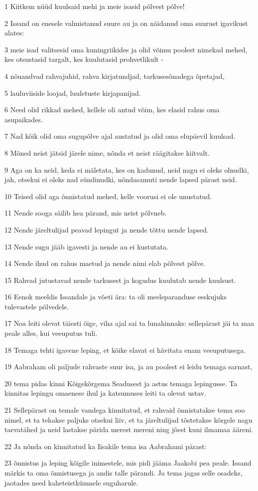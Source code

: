 \par 1 Kiitkem nüüd kuulsaid mehi ja meie isasid põlvest põlve!
\par 2 Issand on enesele valmistanud suure au ja on näidanud oma suurust igavikust alates:
\par 3 meie isad valitsesid oma kuningriikides ja olid võimu poolest nimekad mehed, kes otsustasid targalt, kes kuulutasid prohvetlikult -
\par 4 nõuandvad rahvajuhid, rahva kirjatundjad, tarkusesõnadega õpetajad,
\par 5 lauluviiside loojad, luuletuste kirjapanijad.
\par 6 Need olid rikkad mehed, kellele oli antud võim, kes elasid rahus oma asupaikades.
\par 7 Nad kõik olid oma sugupõlve ajal austatud ja olid oma elupäevil kuulsad.
\par 8 Mõned neist jätsid järele nime, nõnda et neist räägitakse kiitvalt.
\par 9 Aga on ka neid, keda ei mäletata, kes on kadunud, neid nagu ei oleks olnudki, jah, otsekui ei oleks nad sündinudki, nõndasamuti nende lapsed pärast neid.
\par 10 Teised olid aga õnnistatud mehed, kelle voorusi ei ole unustatud.
\par 11 Nende sooga säilib hea pärand, mis neist põlvneb.
\par 12 Nende järeltulijad peavad lepingut ja nende tõttu nende lapsed.
\par 13 Nende sugu jääb igavesti ja nende au ei kustutata.
\par 14 Nende ihud on rahus maetud ja nende nimi elab põlvest põlve.
\par 15 Rahvad jutustavad nende tarkusest ja kogudus kuulutab nende kuulsust.
\par 16 Eenok meeldis Issandale ja võeti ära: ta oli meeleparanduse eeskujuks tulevastele põlvedele.
\par 17 Noa leiti olevat täiesti õige, viha ajal sai ta lunahinnaks: sellepärast jäi ta maa peale alles, kui veeuputus tuli.
\par 18 Temaga tehti igavene leping, et kõike elavat ei hävitata enam veeuputusega.
\par 19 Aabraham oli paljude rahvaste suur isa, ja au poolest ei leidu temaga sarnast,
\par 20 tema pidas kinni Kõigekõrgema Seadusest ja astus temaga lepingusse. Ta kinnitas lepingu omaenese ihul ja katsumuses leiti ta olevat ustav.
\par 21 Sellepärast on temale vandega kinnitatud, et rahvaid õnnistatakse tema soo nimel, et ta tehakse paljuks otsekui liiv, et ta järeltulijad tõstetakse kõrgele nagu taevatähed ja neid lastakse pärida merest mereni ning jõest kuni ilmamaa ääreni.
\par 22 Ja nõnda on kinnitatud ka Iisakile tema isa Aabrahami pärast:
\par 23 õnnistus ja leping kõigile inimestele, mis pidi jääma Jaakobi pea peale. Issand märkis ta oma õnnistusega ja andis talle pärandi. Ja tema jagas selle osadeks, jaotades need kaheteistkümnele suguharule.

